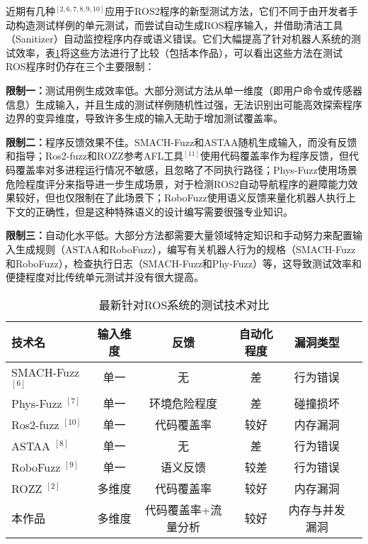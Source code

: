 近期有几种$^{[2, 6, 7, 8, 9, 10]}$应用于ROS2程序的新型测试方法，它们不同于由开发者手动构造测试样例的单元测试，而尝试自动生成ROS程序输入，并借助清洁工具（Sanitizer）自动监控程序内存或语义错误。它们大幅提高了针对机器人系统的测试效率，表\ref{tab:fuzzers}将这些方法进行了比较（包括本作品），可以看出这些方法在测试ROS程序时仍存在三个主要限制：

\textbf{限制一：}测试用例生成效率低。大部分测试方法从单一维度（即用户命令或传感器信息）生成输入，并且生成的测试样例随机性过强，无法识别出可能高效探索程序边界的变异维度，导致许多生成的输入无助于增加测试覆盖率。

\textbf{限制二：}程序反馈效果不佳。SMACH-Fuzz和ASTAA随机生成输入，而没有反馈和指导；Ros2-fuzz和ROZZ参考AFL工具$^{[11]}$使用代码覆盖率作为程序反馈，但代码覆盖率对多进程运行情况不敏感，且忽略了不同执行路径；Phys-Fuzz使用场景危险程度评分来指导进一步生成场景，对于检测ROS2自动导航程序的避障能力效果较好，但也仅限制在了此场景下；RoboFuzz使用语义反馈来量化机器人执行上下文的正确性，但是这种特殊语义的设计编写需要很强专业知识。

\textbf{限制三：}自动化水平低。大部分方法都需要大量领域特定知识和手动努力来配置输入生成规则（ASTAA和RoboFuzz），编写有关机器人行为的规格（SMACH-Fuzz和RoboFuzz），检查执行日志（SMACH-Fuzz和Phy-Fuzz）等，这导致测试效率和便捷程度对比传统单元测试并没有很大提高。

\begin{table}[H]
\small
\centering
\caption{最新针对ROS系统的测试技术对比}
\begin{tabular}{lccccc}
\hline
\textbf{技术名} & \textbf{输入维度}  & \textbf{反馈}& \textbf{自动化程度} & \textbf{漏洞类型} \\ \hline
SMACH-Fuzz $^{[6]}$ & 单一 & 无 & 差 & 行为错误 \\ 
Phys-Fuzz $^{[7]}$ & 单一  & 环境危险程度  & 差& 碰撞损坏 \\ 
Ros2-fuzz $^{[10]}$ & 单一  & 代码覆盖率   & 较好 & 内存漏洞 \\ 
ASTAA $^{[8]}$ & 单一 & 无 & 差 & 行为错误 \\ 
RoboFuzz $^{[9]}$ & 单一  & 语义反馈 & 较差 & 行为错误 \\ 
ROZZ $^{[2]}$ & 多维度 & 代码覆盖率 & 较好 & 内存漏洞 \\ 
本作品 & 多维度  & 代码覆盖率+流量分析 & 较好& 内存与并发漏洞 \\ \hline
\end{tabular}
\label{tab:fuzzers}
\end{table}
